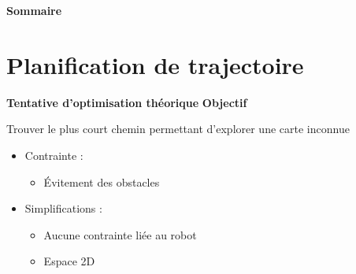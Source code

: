 \documentclass[aspectratio=169,10pt]{beamer}
\begin{document}
\begin{frame}{\textbf{Sommaire}}
    \tableofcontents
\end{frame}




\section{Planification de trajectoire}

\begin{frame}{\textbf{Tentative d'optimisation théorique}}
	\textbf{Objectif}
	\vspace{0.5em}
	
	Trouver le plus court chemin permettant d'explorer une carte inconnue
	
	\vspace{0.5em}
	\begin{itemize}
		\item Contrainte :
		\begin{itemize}
			\item Évitement des obstacles
		\end{itemize}
		\vspace{0.2cm}
		\item Simplifications :
		\begin{itemize}
			\item Aucune contrainte liée au robot
			\vspace{0.2cm}
			\item Espace 2D
		\end{itemize}
	\end{itemize}
	
\end{frame}
\end{document}
